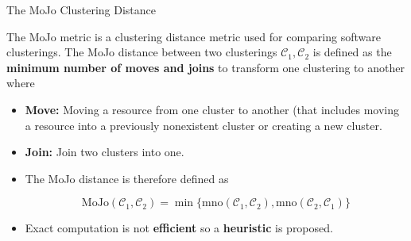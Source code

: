 \documentclass{beamer}
\begin{document}
\begin{frame}{The MoJo Clustering Distance}

The MoJo \cite{mojo} metric is a clustering distance metric used for comparing software clusterings. The MoJo distance between two clusterings $\mathcal C_1, \mathcal C_2$ is defined as the \textbf{minimum number of moves and joins} to transform one clustering to another where 
\begin{itemize}
    \item<1-> \textbf{Move:} Moving a resource from one cluster to another (that includes moving a resource into a previously nonexistent cluster or creating a new cluster.
    \item<2-> \textbf{Join:} Join two clusters into one.
	\item<3-> The MoJo distance is therefore defined as 

$$\textrm{MoJo} (\mathcal C_1, \mathcal C_2) = \min \{ \textrm{mno} (\mathcal C_1, \mathcal C_2), \textrm{mno}(\mathcal C_2, \mathcal C_1) \}$$
    \item<4-> Exact computation is not \textbf{efficient} so a \textbf{heuristic} is proposed.


\end{itemize}

\end{frame}
\end{document}
